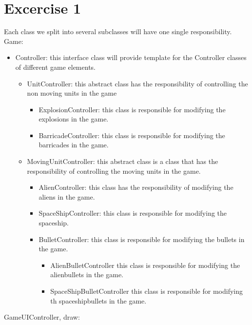 \documentclass[10pt]{article}
\begin{document}
\section*{Excercise 1}
Each class we split into several subclasses will have one single responsibility. \\
Game:
\begin{itemize}
\item Controller: this interface class will provide template for the Controller classes of different game elements. 
\begin{itemize}
\item UnitController: this abstract class has the responsibility of controlling the non moving units in the game
\begin{itemize}
\item ExplosionController: this class is responsible for modifying the explosions in the game.
\item BarricadeController: this class is responsible for modifying the barricades in the game.
\end{itemize}
\item MovingUnitController: this abstract class is a class that has the responsibility of controlling the moving units in the game. 
\begin{itemize}
	\item AlienController: this class has the responsibility of modifying the aliens in the game.
	\item SpaceShipController: this class is responsible for modifying the spaceship.
	\item BulletController: this class is responsible for modifying the bullets in the game.
	\begin{itemize}
		\item AlienBulletController this class is responsible for modifying the alienbullets in the game.
		\item SpaceShipBulletController this class is responsible for modifying th spaceshipbullets in the game.
	\end{itemize}
\end{itemize}
\end{itemize}
\end{itemize}
GameUIController, draw:
\end{document}
